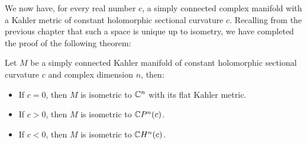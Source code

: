 We now have, for every real number $c$, a simply connected complex manifold with a Kahler metric of constant holomorphic sectional curvature $c$.  Recalling from the previous chapter that such a space is unique up to isometry, we have completed the proof of the following theorem:

\begin{thm} Let $M$ be a simply connected Kahler manifold of constant holomorphic sectional curvature $c$ and complex dimension $n$, then:
%
\begin{itemize}
%
\item If $c = 0$, then $M$ is isometric to $\mathbb{C}^n$ with its flat Kahler metric.
\item If $c > 0$, then $M$ is isometric to $\mathbb{C}P^n (c)$.
\item If $c < 0$, then $M$ is isometric to $\mathbb{C}H^n (c)$.
%
\end{itemize}
%
\end{thm}
